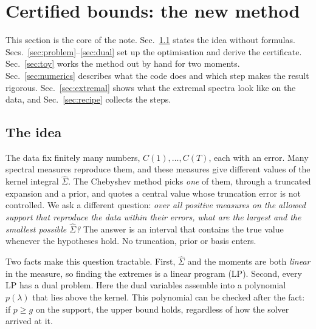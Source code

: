\documentclass[11pt]{article}
\theoremstyle{remark}
\begin{document}
\section{Certified bounds: the new method}\label{sec:bounds}
This section is the core of the note. Sec.~\ref{sec:idea} states the idea without formulas. Secs.~\ref{sec:problem}--\ref{sec:dual} set up the optimisation and derive the certificate.
Sec.~\ref{sec:toy} works the method out by hand for two moments. Sec.~\ref{sec:numerics} describes what the code does and which step makes the result rigorous.
Sec.~\ref{sec:extremal} shows what the extremal spectra look like on the data, and Sec.~\ref{sec:recipe} collects the steps.

\subsection{The idea}\label{sec:idea}
The data fix finitely many numbers, $C(1),\dots,C(T)$, each with an error. Many spectral measures reproduce them, and these measures give different values of the kernel integral
$\hat\Sigma$. The Chebyshev method picks \emph{one} of them, through a truncated expansion and a prior, and quotes a central value whose truncation error is not controlled.
We ask a different question: \emph{over all positive measures on the allowed support that reproduce the data within their errors, what are the largest and the smallest possible $\hat\Sigma$?}
The answer is an interval that contains the true value whenever the hypotheses hold. No truncation, prior or basis enters.

Two facts make this question tractable. First, $\hat\Sigma$ and the moments are both \emph{linear} in the measure, so finding the extremes is a linear program (LP).
Second, every LP has a dual problem. Here the dual variables assemble into a polynomial $p(\lambda)$ that lies above the kernel. This polynomial can be checked after the fact:
if $p\ge g$ on the support, the upper bound holds, regardless of how the solver arrived at it.
\end{document}
